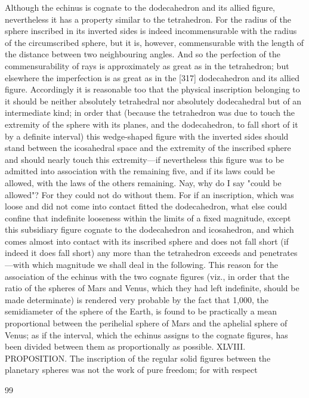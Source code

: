 \documentclass{article}
\begin{document}
Although the echinus is cognate to the dodecahedron and its allied
figure, nevertheless it has a property similar to the tetrahedron. For the
radius of the sphere inscribed in its inverted sides is indeed
incommensurable with the radius of the circumscribed sphere, but it is,
however, commensurable with the length of the distance between two
neighbouring angles. And so the perfection of the commensurability of
rays is approximately as great as in the tetrahedron; but elsewhere the
imperfection is as great as in the [317] dodecahedron and its allied
figure. Accordingly it is reasonable too that the physical inscription
belonging to it should be neither absolutely tetrahedral nor absolutely
dodecahedral but of an intermediate kind; in order that (because the
tetrahedron was due to touch the extremity of the sphere with its planes,
and the dodecahedron, to fall short of it by a definite interval) this
wedge-shaped figure with the inverted sides should stand between the
icosahedral space and the extremity of the inscribed sphere and should
nearly touch this extremity—if nevertheless this figure was to be
admitted into association with the remaining five, and if its laws could be
allowed, with the laws of the others remaining. Nay, why do I say "could
be allowed"? For they could not do without them. For if an inscription,
which was loose and did not come into contact fitted the dodecahedron,
what else could confine that indefinite looseness within the limits of a
fixed magnitude, except this subsidiary figure cognate to the
dodecahedron and icosahedron, and which comes almost into contact
with its inscribed sphere and does not fall short (if indeed it does fall
short) any more than the tetrahedron exceeds and penetrates —with
which magnitude we shall deal in the following.
This reason for the association of the echinus with the two cognate
figures (viz., in order that the ratio of the spheres of Mars and Venus,
which they had left indefinite, should be made determinate) is rendered
very probable by the fact that 1,000, the semidiameter of the sphere of
the Earth, is found to be practically a mean proportional between the
perihelial sphere of Mars and the aphelial sphere of Venus; as if the
interval, which the echinus assigns to the cognate figures, has been
divided between them as proportionally as possible. XLVIII.
PROPOSITION. The inscription of the regular solid figures between the
planetary spheres was not the work of pure freedom; for with respect


99
\end{document}
